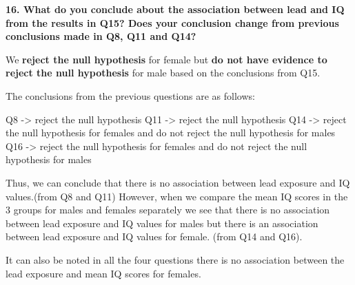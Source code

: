 \documentclass[
]{article}
\begin{document}
\textbf{16. What do you conclude about the association between lead and
IQ from the results in Q15? Does your conclusion change from previous
conclusions made in Q8, Q11 and Q14?}

We \textbf{reject the null hypothesis} for female but \textbf{do not
have evidence to reject the null hypothesis} for male based on the
conclusions from Q15.

The conclusions from the previous questions are as follows:

Q8 -\textgreater{} reject the null hypothesis Q11 -\textgreater{} reject
the null hypothesis Q14 -\textgreater{} reject the null hypothesis for
females and do not reject the null hypothesis for males Q16
-\textgreater{} reject the null hypothesis for females and do not reject
the null hypothesis for males

Thus, we can conclude that there is no association between lead exposure
and IQ values.(from Q8 and Q11) However, when we compare the mean IQ
scores in the 3 groups for males and females separately we see that
there is no association between lead exposure and IQ values for males
but there is an association between lead exposure and IQ values for
female. (from Q14 and Q16).

It can also be noted in all the four questions there is no association
between the lead exposure and mean IQ scores for females.
\end{document}
